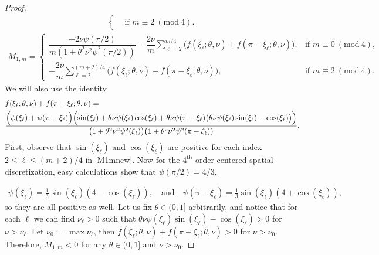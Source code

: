 \documentclass[a4paper]{article}
\newcommand{\Mod}[1]{\ (\mathrm{mod}\ #1)}
\begin{document}
\begin{description}[style=unboxed,leftmargin=0cm]
\begin{proof}
\begin{align}
\begin{cases}
									& \text{if } m \equiv 2 \Mod{4}.
							\end{cases}
		\end{align}
	\else
		\begin{align}\label{M1mnew}
			M_{1,m} = \begin{cases}
								\dfrac{-2\nu\psi(\pi/2)}{m\left(1+\theta^2\nu^2\psi^2(\pi/2)\right)} -
									\dfrac{2\nu}{m} \displaystyle{\sum\limits_{\ell=2}^{m/4}}
									\Big(f(\xi_\ell; \theta, \nu) + f(\pi-\xi_\ell; \theta, \nu) \Big),
									& \text{if } m \equiv 0 \Mod{4}, \\[20pt]
								-\dfrac{2\nu}{m} \displaystyle{\sum\limits_{\ell=2}^{(m+2)/4}}
									\Big(f(\xi_\ell; \theta, \nu) + f(\pi-\xi_\ell; \theta, \nu)\Big),
									& \text{if } m \equiv 2 \Mod{4}.
							\end{cases}
		\end{align}
	\fi
	We will also use the identity
	\begin{align*}
		&f(\xi_\ell; \theta, \nu) + f(\pi-\xi_\ell; \theta, \nu) = \\
			&\frac{\Bigl(\psi(\xi_\ell) + \psi(\pi-\xi_\ell)\Bigr)
			\Bigl(\sin(\xi_\ell) + \theta\nu\psi(\xi_\ell)\cos(\xi_\ell) +
			\theta\nu\psi(\pi-\xi_\ell)\bigl(\theta\nu\psi(\xi_\ell)\sin(\xi_\ell)-\cos(\xi_\ell)\bigr)\Bigr)}
				{\bigl(1+\theta^2\nu^2\psi^2(\xi_\ell)\bigr)\bigl(1+\theta^2\nu^2\psi^2(\pi-\xi_\ell)\bigr)}.
	\end{align*}
	First, observe that $\sin(\xi_\ell)$ and $\cos(\xi_\ell)$ are positive for each index $2 \le \ell \le (m+2)/4$ in
	\eqref{M1mnew}. Now for the $4^\text{th}$-order centered spatial discretization, easy calculations show that $\psi(\pi/2) = 4/3$,
	
	\begin{align*}
		\psi(\xi_\ell) = \frac{1}{3}\sin(\xi_\ell)(4 - \cos(\xi_\ell)), \quad \text{and} \quad
		\psi(\pi - \xi_\ell) = \frac{1}{3}\sin(\xi_\ell)(4 + \cos(\xi_\ell)),
	\end{align*}
	so they are all positive as well. Let us fix $\theta \in (0,1]$ arbitrarily, and notice that for each $\ell$ we can find $\nu_\ell > 0$ such that
	$\theta\nu\psi(\xi_\ell)\sin(\xi_\ell)-\cos(\xi_\ell)>0$ for $\nu>\nu_\ell$. Let $\nu_0:=\max \nu_\ell$, then  
	$f(\xi_\ell; \theta, \nu) + f(\pi-\xi_\ell; \theta, \nu)>0$ for $\nu>\nu_0$. Therefore, $M_{1,m} < 0$ for any $\theta \in (0,1]$ and $\nu>\nu_0$.


\end{proof}
\end{description}
\end{document}
